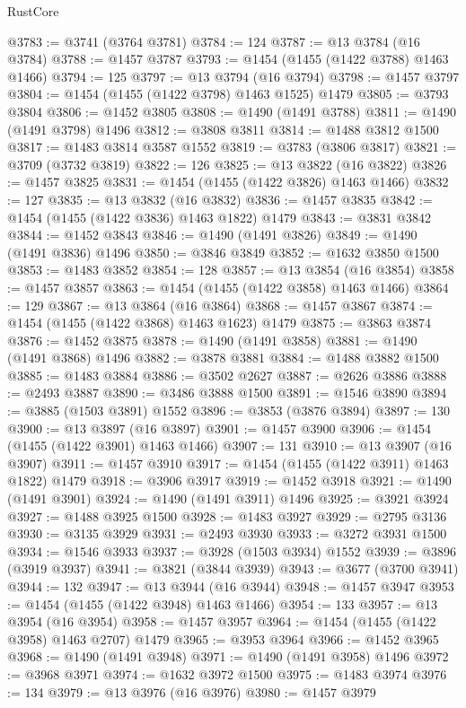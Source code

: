 \begin{lexlean}{RustCore}
\begin{coremodule}
@3783 := @3741 (@3764 @3781)
@3784 := 124
@3787 := @13 @3784 (@16 @3784)
@3788 := @1457 @3787
@3793 := @1454 (@1455 (@1422 @3788) @1463 @1466)
@3794 := 125
@3797 := @13 @3794 (@16 @3794)
@3798 := @1457 @3797
@3804 := @1454 (@1455 (@1422 @3798) @1463 @1525) @1479
@3805 := @3793 @3804
@3806 := @1452 @3805
@3808 := @1490 (@1491 @3788)
@3811 := @1490 (@1491 @3798) @1496
@3812 := @3808 @3811
@3814 := @1488 @3812 @1500
@3817 := @1483 @3814 @3587 @1552
@3819 := @3783 (@3806 @3817)
@3821 := @3709 (@3732 @3819)
@3822 := 126
@3825 := @13 @3822 (@16 @3822)
@3826 := @1457 @3825
@3831 := @1454 (@1455 (@1422 @3826) @1463 @1466)
@3832 := 127
@3835 := @13 @3832 (@16 @3832)
@3836 := @1457 @3835
@3842 := @1454 (@1455 (@1422 @3836) @1463 @1822) @1479
@3843 := @3831 @3842
@3844 := @1452 @3843
@3846 := @1490 (@1491 @3826)
@3849 := @1490 (@1491 @3836) @1496
@3850 := @3846 @3849
@3852 := @1632 @3850 @1500
@3853 := @1483 @3852
@3854 := 128
@3857 := @13 @3854 (@16 @3854)
@3858 := @1457 @3857
@3863 := @1454 (@1455 (@1422 @3858) @1463 @1466)
@3864 := 129
@3867 := @13 @3864 (@16 @3864)
@3868 := @1457 @3867
@3874 := @1454 (@1455 (@1422 @3868) @1463 @1623) @1479
@3875 := @3863 @3874
@3876 := @1452 @3875
@3878 := @1490 (@1491 @3858)
@3881 := @1490 (@1491 @3868) @1496
@3882 := @3878 @3881
@3884 := @1488 @3882 @1500
@3885 := @1483 @3884
@3886 := @3502 @2627
@3887 := @2626 @3886
@3888 := @2493 @3887
@3890 := @3486 @3888 @1500
@3891 := @1546 @3890
@3894 := @3885 (@1503 @3891) @1552
@3896 := @3853 (@3876 @3894)
@3897 := 130
@3900 := @13 @3897 (@16 @3897)
@3901 := @1457 @3900
@3906 := @1454 (@1455 (@1422 @3901) @1463 @1466)
@3907 := 131
@3910 := @13 @3907 (@16 @3907)
@3911 := @1457 @3910
@3917 := @1454 (@1455 (@1422 @3911) @1463 @1822) @1479
@3918 := @3906 @3917
@3919 := @1452 @3918
@3921 := @1490 (@1491 @3901)
@3924 := @1490 (@1491 @3911) @1496
@3925 := @3921 @3924
@3927 := @1488 @3925 @1500
@3928 := @1483 @3927
@3929 := @2795 @3136
@3930 := @3135 @3929
@3931 := @2493 @3930
@3933 := @3272 @3931 @1500
@3934 := @1546 @3933
@3937 := @3928 (@1503 @3934) @1552
@3939 := @3896 (@3919 @3937)
@3941 := @3821 (@3844 @3939)
@3943 := @3677 (@3700 @3941)
@3944 := 132
@3947 := @13 @3944 (@16 @3944)
@3948 := @1457 @3947
@3953 := @1454 (@1455 (@1422 @3948) @1463 @1466)
@3954 := 133
@3957 := @13 @3954 (@16 @3954)
@3958 := @1457 @3957
@3964 := @1454 (@1455 (@1422 @3958) @1463 @2707) @1479
@3965 := @3953 @3964
@3966 := @1452 @3965
@3968 := @1490 (@1491 @3948)
@3971 := @1490 (@1491 @3958) @1496
@3972 := @3968 @3971
@3974 := @1632 @3972 @1500
@3975 := @1483 @3974
@3976 := 134
@3979 := @13 @3976 (@16 @3976)
@3980 := @1457 @3979

\end{coremodule}
\end{lexlean}
